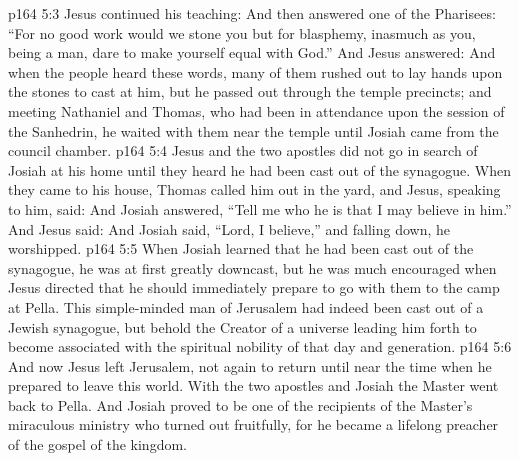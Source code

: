 \vs p164 5:3 Jesus continued his teaching:  And then answered one of the Pharisees: “For no good work would we stone you but for blasphemy, inasmuch as you, being a man, dare to make yourself equal with God.” And Jesus answered:  And when the people heard these words, many of them rushed out to lay hands upon the stones to cast at him, but he passed out through the temple precincts; and meeting Nathaniel and Thomas, who had been in attendance upon the session of the Sanhedrin, he waited with them near the temple until Josiah came from the council chamber.
\vs p164 5:4 Jesus and the two apostles did not go in search of Josiah at his home until they heard he had been cast out of the synagogue. When they came to his house, Thomas called him out in the yard, and Jesus, speaking to him, said:  And Josiah answered, “Tell me who he is that I may believe in him.” And Jesus said:  And Josiah said, “Lord, I believe,” and falling down, he worshipped.
\vs p164 5:5 When Josiah learned that he had been cast out of the synagogue, he was at first greatly downcast, but he was much encouraged when Jesus directed that he should immediately prepare to go with them to the camp at Pella. This simple\hyp{}minded man of Jerusalem had indeed been cast out of a Jewish synagogue, but behold the Creator of a universe leading him forth to become associated with the spiritual nobility of that day and generation.
\vs p164 5:6 And now Jesus left Jerusalem, not again to return until near the time when he prepared to leave this world. With the two apostles and Josiah the Master went back to Pella. And Josiah proved to be one of the recipients of the Master’s miraculous ministry who turned out fruitfully, for he became a lifelong preacher of the gospel of the kingdom.
